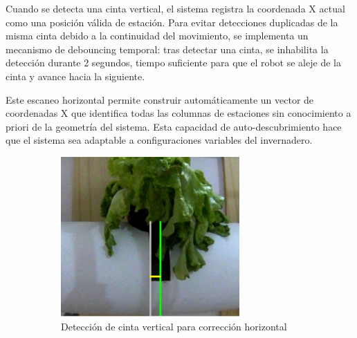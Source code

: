 Cuando se detecta una cinta vertical, el sistema registra la coordenada X actual como una posición válida de estación. Para evitar detecciones duplicadas de la misma cinta debido a la continuidad del movimiento, se implementa un mecanismo de debouncing temporal: tras detectar una cinta, se inhabilita la detección durante 2 segundos, tiempo suficiente para que el robot se aleje de la cinta y avance hacia la siguiente.

Este escaneo horizontal permite construir automáticamente un vector de coordenadas X que identifica todas las columnas de estaciones sin conocimiento a priori de la geometría del sistema. Esta capacidad de auto-descubrimiento hace que el sistema sea adaptable a configuraciones variables del invernadero.

\begin{figure}[H]
\centering
\begin{subfigure}[b]{0.48\textwidth}
    \centering
    \includegraphics[width=\textwidth]{imagenes/detector_marcadores_5_lineas_verticales.png}
    \caption{Detección de cinta vertical para corrección horizontal}
\end{subfigure}
\hfill
\begin{subfigure}[b]{0.48\textwidth}
    \centering

\end{subfigure}
\end{figure}
